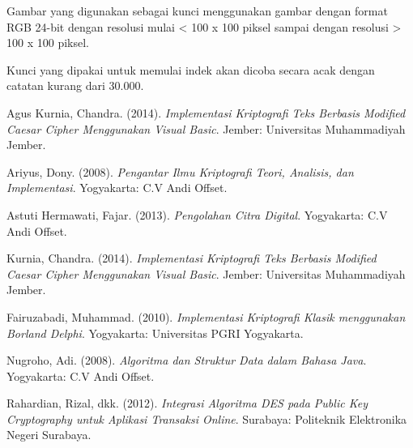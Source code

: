 \documentclass{jtetiproposalskripsi}
\begin{document}
Gambar yang digunakan sebagai kunci menggunakan gambar dengan format RGB 24-bit dengan resolusi mulai < 100 x 100 piksel sampai dengan resolusi > 100 x 100 piksel.

Kunci yang dipakai untuk memulai indek akan dicoba secara acak dengan catatan kurang dari 30.000.




\begin{thebibliography}{9}

Agus Kurnia, Chandra. (2014). \emph{Implementasi Kriptografi Teks Berbasis Modified Caesar Cipher Menggunakan Visual Basic}. Jember: Universitas Muhammadiyah Jember.

Ariyus, Dony. (2008). \emph{Pengantar Ilmu Kriptografi Teori, Analisis, dan Implementasi}. Yogyakarta: C.V Andi Offset.

Astuti Hermawati, Fajar. (2013). \emph{Pengolahan Citra Digital}. Yogyakarta: C.V Andi Offset.

Kurnia, Chandra. (2014). \emph{Implementasi Kriptografi Teks Berbasis Modified Caesar Cipher Menggunakan Visual Basic}. Jember: Universitas Muhammadiyah Jember.

Fairuzabadi, Muhammad. (2010). \emph{Implementasi Kriptografi Klasik menggunakan Borland Delphi}. Yogyakarta: Universitas PGRI Yogyakarta.

Nugroho, Adi. (2008). \emph{Algoritma dan Struktur Data dalam Bahasa Java}. Yogyakarta: C.V Andi Offset.

Rahardian, Rizal, dkk. (2012). \emph{Integrasi Algoritma DES pada Public Key Cryptography untuk Aplikasi Transaksi Online}. Surabaya: Politeknik Elektronika Negeri Surabaya.

\end{thebibliography}
\end{document}

